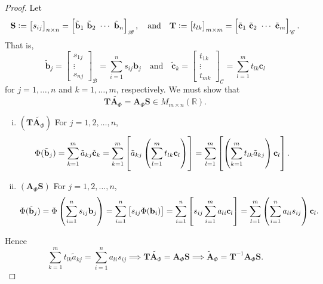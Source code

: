 \documentclass[12pt,openany]{book}
\theoremstyle{definition}
\newcommand{\R}{\mathbb{R}}
\newcommand{\of}[1]{\left( #1 \right)}
\newcommand{\by}{\times}
\newcommand{\basis}{\mathscr{B}}
\newcommand{\scrC}{\mathscr{C}}
\begin{document}
	\begin{proof}
		Let \[
			\textbf{S}:=\sbr[1]{s_{ij}}_{n\by n}=\sbr[2]{\tilde{\textbf{b}}_1\ \tilde{\textbf{b}}_2\ \cdots\ \tilde{\textbf{b}}_n}_{\basis},\quad
			\text{and}\quad
			\textbf{T}:=\sbr[1]{t_{lk}}_{m\by m}=\sbr[2]{\tilde{\textbf{c}}_1\ \tilde{\textbf{c}}_2\ \cdots\ \tilde{\textbf{c}}_m}_{\scrC}.
		\] That is, \[
		\tilde{\textbf{b}}_j=\begin{bmatrix}
			s_{1j} \\ \vdots \\ s_{nj}
		\end{bmatrix}_{\mathscr{B}}=\sum_{i=1}^ns_{ij}\textbf{b}_j\quad\text{and}\quad \tilde{\textbf{c}}_k=\begin{bmatrix}
		t_{1k} \\ \vdots \\ t_{mk}
		\end{bmatrix}_{\mathscr{C}}=\sum_{l=1}^mt_{lk}\textbf{c}_l
		\] for $j=1,\dots,n$ and $k=1,\dots,m$, respectively. We must show that \[
		\textbf{T}\tilde{\textbf{A}_\Phi}=\textbf{A}_\Phi\textbf{S}\in M_{m\by n}(\R).
		\] \begin{enumerate}[(i)]
			\item \((\textbf{T}\tilde{\textbf{A}_\Phi})\) For \(j=1,2,\dots,n\), \[
			\Phi(\tilde{\textbf{b}}_j)=\sum_{k=1}^{m}\tilde{a}_{kj}\tilde{\textbf{c}}_k=\sum_{k=1}^m\sbr{\tilde{a}_{kj}\del{\sum_{l=1}^mt_{lk}\textbf{c}_l}}=\sum_{l=1}^m\sbr{\del{\sum_{k=1}^mt_{lk}\tilde{a}_{kj}}\textbf{c}_l}.
			\]
			\item \((\textbf{A}_\Phi\textbf{S})\) For \(j=1,2,\dots,n\), \[
			\Phi(\tilde{\textbf{b}}_j)=\Phi\of{\sum_{i=1}^ns_{ij}\textbf{b}_j}=\sum_{i=1}^n\sbr{s_{ij}\Phi(\textbf{b}_i)}=\sum_{i=1}^n\sbr{s_{ij}\sum_{i=1}^ma_{li}\textbf{c}_l}=\sum_{l=1}^m\of{\sum_{i=1}^na_{li}s_{ij}}\textbf{c}_l.
			\]
		\end{enumerate}
		 Hence \[
		 \sum_{k=1}^mt_{lk}\tilde{a}_{kj}=\sum_{i=1}^na_{li}s_{ij}\implies\textbf{T}\tilde{\textbf{A}_\Phi}=\textbf{A}_\Phi\textbf{S}\implies\tilde{\textbf{A}}_\Phi=\textbf{T}^{-1}\textbf{A}_\Phi \textbf{S}.
		 \]
	\end{proof}
	
\end{document}
